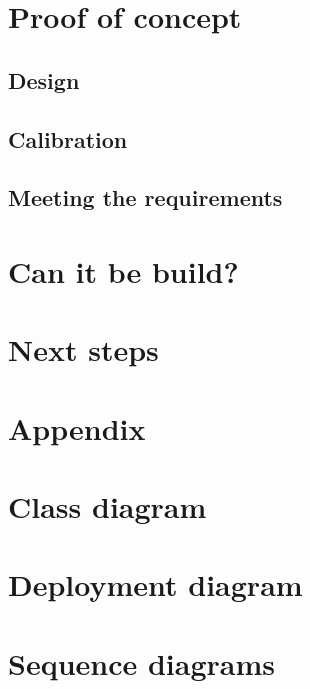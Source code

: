 \documentclass[10pt,a4paper,twocolumn]{article}
\begin{document}
\section{Proof of concept}
\subsection{Design}

\subsection{Calibration}

\subsection{Meeting the requirements}

\section{Can it be build?}

\section{Next steps}

\newpage
\newpage
\section*{Appendix}
\appendix
\section{Class diagram}

\section{Deployment diagram}

\section{Sequence diagrams}
\end{document}
